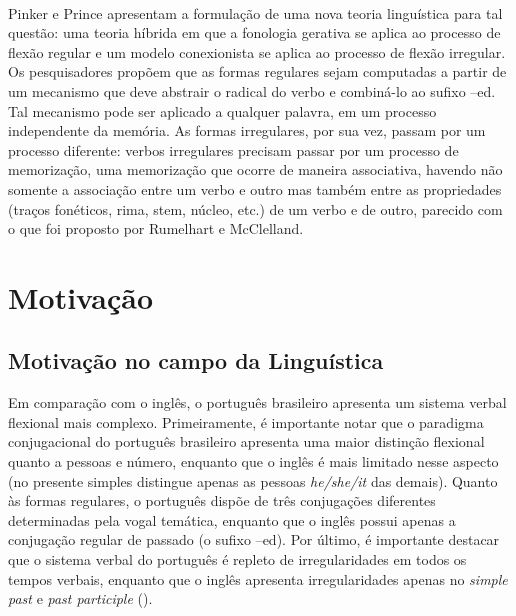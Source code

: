 \\
Pinker e Prince \citeyear{Pinker:1988} apresentam a formulação de uma nova teoria linguística para tal questão: uma teoria híbrida em que a fonologia gerativa se aplica ao processo de flexão regular e um modelo conexionista se aplica ao processo de flexão irregular. Os pesquisadores propõem que as formas regulares sejam computadas a partir de um mecanismo que deve abstrair o radical do verbo e combiná-lo ao sufixo –ed.  Tal mecanismo pode ser aplicado a qualquer palavra, em um processo independente da memória. As formas irregulares, por sua vez, passam por um processo diferente: verbos irregulares precisam passar por um processo de memorização, uma memorização que ocorre de maneira associativa, havendo não somente a associação entre um verbo e outro mas também entre as propriedades (traços fonéticos, rima, stem, núcleo, etc.) de um verbo e de outro, parecido com o que foi proposto por Rumelhart e McClelland.

\section{Motivação}
\label{sec:motivation}

\subsection{Motivação no campo da Linguística}

Em comparação com o inglês, o português brasileiro apresenta um sistema verbal flexional mais complexo. Primeiramente, é importante notar que o paradigma conjugacional do português brasileiro apresenta uma maior distinção flexional quanto a pessoas e número, enquanto que o inglês é mais limitado nesse aspecto (no presente simples distingue apenas as pessoas \textit{he/she/it} das demais). Quanto às formas regulares, o português dispõe de três conjugações diferentes determinadas pela vogal temática, enquanto que o inglês possui apenas a conjugação regular de passado (o sufixo –ed). Por último, é importante destacar que o sistema verbal do português é repleto de irregularidades em todos os tempos verbais, enquanto que o inglês apresenta irregularidades apenas no \textit{simple past} e \textit{past participle} (\cite{wuerges:2014}).


